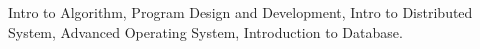 

\begin{cvparagraph}
Intro to Algorithm, Program Design and Development, Intro to Distributed System, Advanced
Operating System, Introduction to Database.
\end{cvparagraph}

